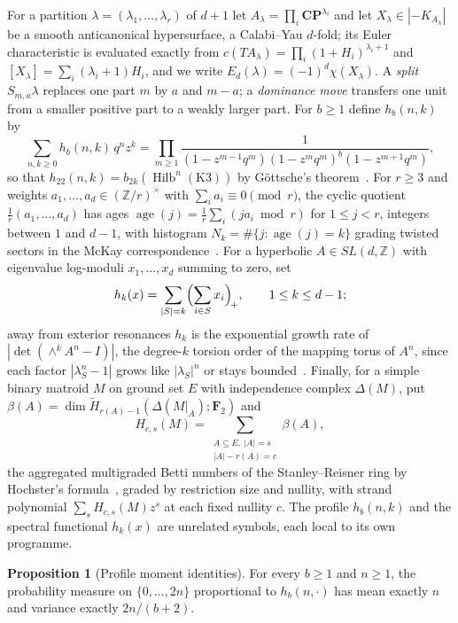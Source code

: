 \documentclass[11pt]{article}
\theoremstyle{definition}
\newcommand{\Z}{\mathbb Z}
\providecommand{\Z}{\mathbb Z}
\newtheorem{proposition}{Proposition}
\begin{document}
For a partition $\lambda=(\lambda_1,\ldots,\lambda_r)$ of $d+1$ let $A_\lambda=\prod_i\mathbf{CP}^{\lambda_i}$ and let $X_\lambda\in|{-K_{A_\lambda}}|$ be a smooth anticanonical hypersurface, a Calabi--Yau $d$-fold; its Euler characteristic is evaluated exactly from $c(TA_\lambda)=\prod_i(1+H_i)^{\lambda_i+1}$ and $[X_\lambda]=\sum_i(\lambda_i+1)H_i$, and we write $E_d(\lambda)=(-1)^d\chi(X_\lambda)$.  A \emph{split} $S_{m,a}\lambda$ replaces one part $m$ by $a$ and $m-a$; a \emph{dominance move} transfers one unit from a smaller positive part to a weakly larger part.  For $b\ge1$ define $h_b(n,k)$ by
\[
\sum_{n,k\ge0}h_b(n,k)\,q^nz^k=
\prod_{m\ge1}\frac{1}{(1-z^{m-1}q^m)(1-z^mq^m)^b(1-z^{m+1}q^m)},
\]
so that $h_{22}(n,k)=b_{2k}(\operatorname{Hilb}^n(\mathrm{K3}))$ by G\"ottsche's theorem~\cite{Go90}.  For $r\ge3$ and weights $a_1,\ldots,a_d\in(\Z/r)^\times$ with $\sum_ia_i\equiv0\pmod r$, the cyclic quotient $\tfrac1r(a_1,\ldots,a_d)$ has ages $\operatorname{age}(j)=\tfrac1r\sum_i(ja_i\bmod r)$ for $1\le j<r$, integers between $1$ and $d-1$, with histogram $N_k=\#\{j:\operatorname{age}(j)=k\}$ grading twisted sectors in the McKay correspondence~\cite{Reid02}.  For a hyperbolic $A\in SL(d,\Z)$ with eigenvalue log-moduli $x_1,\ldots,x_d$ summing to zero, set
\[
h_k(x)=\sum_{|S|=k}\Bigl(\sum_{i\in S}x_i\Bigr)_{\!+},\qquad1\le k\le d-1;
\]
away from exterior resonances $h_k$ is the exponential growth rate of $|\det(\wedge^kA^n-I)|$, the degree-$k$ torsion order of the mapping torus of $A^n$, since each factor $|\lambda_S^n-1|$ grows like $|\lambda_S|^n$ or stays bounded~\cite{BV13,BLP10}.  Finally, for a simple binary matroid $M$ on ground set $E$ with independence complex $\Delta(M)$, put $\beta(A)=\dim\widetilde H_{r(A)-1}(\Delta(M|_A);\mathbf F_2)$ and
\[
H_{c,s}(M)=\sum_{\substack{A\subseteq E,\ |A|=s\\|A|-r(A)=c}}\beta(A),
\]
the aggregated multigraded Betti numbers of the Stanley--Reisner ring by Hochster's formula~\cite{Hoch77}, graded by restriction size and nullity, with strand polynomial $\sum_sH_{c,s}(M)z^s$ at each fixed nullity $c$.  The profile $h_b(n,k)$ and the spectral functional $h_k(x)$ are unrelated symbols, each local to its own programme.

\begin{proposition}[Profile moment identities]\label{y:mom}
For every $b\ge1$ and $n\ge1$, the probability measure on $\{0,\ldots,2n\}$ proportional to $h_b(n,\cdot)$ has mean exactly $n$ and variance exactly $2n/(b+2)$.
\end{proposition}
\end{document}

